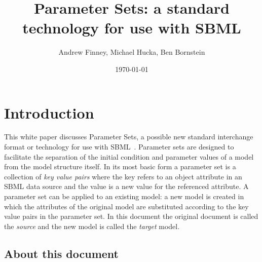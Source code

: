 \documentclass[10pt,twocolumntoc]{cekarticle}
\begin{document}

\title{Parameter Sets: a standard technology for use with SBML}

\author{Andrew Finney, Michael Hucka, Ben Bornstein}


\address{Systems Biology Workbench Development Group\\
  ERATO Kitano Systems Biology Project\\
  Control and Dynamical Systems, MC 107-81\\
  California Institute of Technology, Pasadena, CA 91125, USA\\[3pt]
  \url{http://www.cds.caltech.edu/erato}}


\date{\today{}}

\maketitlepage

\section{Introduction}
\label{sec:introduction}

This white paper discusses Parameter Sets, a possible new standard interchange format
or technology for use with SBML~\citep{hucka:2001}.  Parameter sets are designed to facilitate the
separation of the initial condition and parameter values of a model from the model structure
itself. In its most basic form a parameter set is
a collection of \emph{key value pairs} where the key refers to an object attribute in an SBML
data source and the value is a new value for the referenced attribute.  A parameter set
can be applied to an existing model: a new model is created in which the attributes of
the original model are substituted according to the key value pairs in the parameter set.
In this document the original document is called the \emph{source} and the new model is
called the \emph{target} model.

\subsection{About this document}
\end{document}
